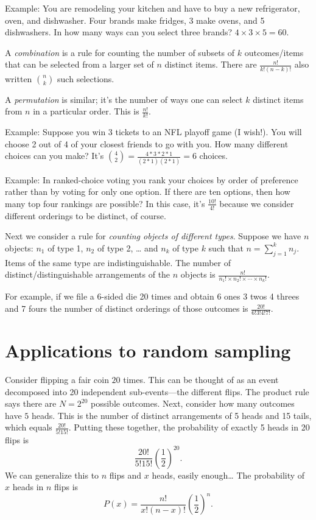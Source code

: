 \documentclass[]{book}
\begin{document}
Example: You are remodeling your kitchen and have to buy a new
refrigerator, oven, and dishwasher. Four brands make fridges, 3 make
ovens, and 5 dishwashers. In how many ways can you select three brands?
\(4\times 3\times 5 = 60\).

A \emph{combination} is a rule for counting the number of subsets of
\(k\) outcomes/items that can be selected from a larger set of \(n\)
distinct items. There are \(\frac{n!}{k!(n-k)!}\) also written
\({n \choose k}\) such selections.

A \emph{permutation} is similar; it's the number of ways one can select
\(k\) distinct items from \(n\) in a particular order. This is
\(\frac{n!}{k!}\).

Example: Suppose you win 3 tickets to an NFL playoff game (I wish!). You
will choose 2 out of 4 of your closest friends to go with you. How many
different choices can you make? It's
\({4\choose 2} = \frac{4*3*2*1}{(2*1)(2*1) } = 6\) choices.

Example: In ranked-choice voting you rank your choices by order of
preference rather than by voting for only one option. If there are ten
options, then how many top four rankings are possible? In this case,
it's \(\frac{10!}{4!}\) because we consider different orderings to be
distinct, of course.

Next we consider a rule for \emph{counting objects of different types}.
Suppose we have \(n\) objects: \(n_1\) of type 1, \(n_2\) of type 2,
\ldots{} and \(n_k\) of type \(k\) such that \(n=\sum_{j=1}^k n_j\).
Items of the same type are indistinguishable. The number of
distinct/distinguishable arrangements of the \(n\) objects is
\(\frac{n!}{n_1!\times n_2! \times \cdots \times n_k! }\).

For example, if we file a 6-sided die 20 times and obtain 6 ones 3 twos
4 threes and 7 fours the number of distinct orderings of those outcomes
is \(\frac{20!}{6!3!4!7!}\).

\section{Applications to random
sampling}\label{applications-to-random-sampling}

Consider flipping a fair coin \(20\) times. This can be thought of as an
event decomposed into 20 independent sub-events---the different flips.
The product rule says there are \(N = 2^{20}\) possible outcomes. Next,
consider how many outcomes have \(5\) heads. This is the number of
distinct arrangements of 5 heads and 15 tails, which equals
\(\frac{20!}{5!15!}\). Putting these together, the probability of
exactly 5 heads in 20 flips is \[\frac{20!}{5!15!}(\frac{1}{2})^{20}.\]
We can generalize this to \(n\) flips and \(x\) heads, easily
enough\ldots{} The probability of \(x\) heads in \(n\) flips is
\[P(x) = \frac{n!}{x!(n-x)!}(\frac{1}{2})^n.\]
\end{document}
